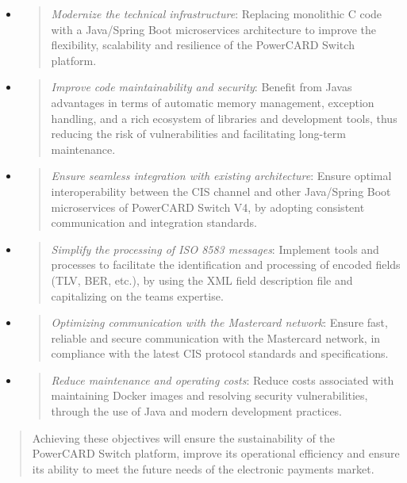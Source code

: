 \documentclass[12pt,a4paper]{report}
\begin{document}
\begin{itemize}
\item
  \begin{quote}
  \emph{Modernize the technical infrastructure}: Replacing monolithic C
  code with a Java/Spring Boot microservices architecture to improve the
  flexibility, scalability and resilience of the PowerCARD Switch
  platform.
  \end{quote}
\item
  \begin{quote}
  \emph{Improve code maintainability and security}: Benefit from
  Java\textquotesingle s advantages in terms of automatic memory
  management, exception handling, and a rich ecosystem of libraries and
  development tools, thus reducing the risk of vulnerabilities and
  facilitating long-term maintenance.
  \end{quote}
\item
  \begin{quote}
  \emph{Ensure seamless integration with existing architecture}: Ensure
  optimal interoperability between the CIS channel and other Java/Spring
  Boot microservices of PowerCARD Switch V4, by adopting consistent
  communication and integration standards.
  \end{quote}
\item
  \begin{quote}
  \emph{Simplify the processing of ISO 8583 messages}: Implement tools
  and processes to facilitate the identification and processing of
  encoded fields (TLV, BER, etc.), by using the XML field description
  file and capitalizing on the team\textquotesingle s expertise.
  \end{quote}
\item
  \begin{quote}
  \emph{Optimizing communication with the Mastercard network}: Ensure
  fast, reliable and secure communication with the Mastercard network,
  in compliance with the latest CIS protocol standards and
  specifications.
  \end{quote}
\item
  \begin{quote}
  \emph{Reduce maintenance and operating costs}: Reduce costs associated
  with maintaining Docker images and resolving security vulnerabilities,
  through the use of Java and modern development practices.
  \end{quote}
\end{itemize}

\begin{quote}
Achieving these objectives will ensure the sustainability of the
PowerCARD Switch platform, improve its operational efficiency and ensure
its ability to meet the future needs of the electronic payments market.
\end{quote}
\end{document}
